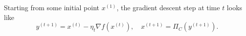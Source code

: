 \documentclass[openany]{book}
\theoremstyle{definition}
\theoremstyle{remark}
\begin{document}
\begin{comment}
Consider $\underline{f}(x)$. We have for any $\lambda\in\Delta_T$,
\begin{equation*}
    \underline{f}(x)\ge \sum_{t=1}^{T}\lambda_t\left(f(x^{(t)})+\langle\nabla f(x^{(t)}),x-x^{(t)}\rangle\right),
\end{equation*}
or
\begin{equation}\label{gradBasedConv}
    \sum_{t=1}^{T}\lambda_t f(x^{(t)})-\underline{f}(x)\le \sum_{t=1}^{T}\lambda_t \langle\nabla f(x^{(t)}),x^{(t)}-x\rangle.
\end{equation}
Thus in general, we can output $\tilde{x}^{(T)}=\arg\min_{1\le t\le T}f(x^{(t)})$ or $\sum_{t=1}^{T}\lambda_tx^{(t)}$ (or any point in the sublevel set of $\overline{f}$ given by this point), and try to bound the right hand side of \eqref{gradBasedConv}. Or we can output $\tilde{x}^{(T)}$, whose guarantee is bounded by the minimum of the right hand side of \eqref{gradBasedConv} when all $\lambda\in\Delta_T$ is considered.
\end{comment}

Starting from some initial point $x^{(1)}$, the gradient descent step at time $t$ looks like
\begin{equation}\label{gradUpdate}
y^{(t+1)}=x^{(t)}-\eta_t\nabla f(x^{(t)}),\quad x^{(t+1)}=\Pi_C\left(y^{(t+1)}\right).
\end{equation}
\end{document}

